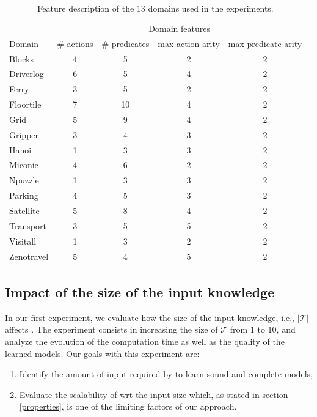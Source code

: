 \begin{table}[hbt!]
		\begin{center}
			\begin{tabular}{l|c|c|c|c|}	
				& \multicolumn{4}{c|}{Domain features}\\ \cline{2-5}
				Domain & \# actions & \# predicates & max action arity & max predicate arity  \\
				\hline
				Blocks & 4 & 5 & 2 & 2  \\
				Driverlog & 6 & 5 & 4 & 2  \\
				Ferry & 3 & 5 & 2 & 2  \\
				Floortile & 7 & 10 & 4 & 2  \\
				Grid & 5 & 9 & 4 & 2  \\
				Gripper & 3 & 4 & 3 & 2  \\
				Hanoi & 1 & 3 & 3 & 2  \\
				Miconic & 4 & 6 & 2 & 2  \\
				Npuzzle & 1 & 3 & 3 & 2  \\
				Parking & 4 & 5 & 3 & 2  \\
				Satellite & 5 & 8 & 4 & 2  \\
				Transport & 3 & 5 & 5 & 2  \\
				Visitall & 1 & 3 & 2 & 2  \\
				Zenotravel & 5 & 4 & 5 & 2
			\end{tabular}
		\end{center}
	\caption{\small Feature description of the 13 domains used in the experiments.}
	\label{tab:domain_features}	
\end{table}

\subsection{Impact of the size of the input knowledge}
In our first experiment, we evaluate how the size of the input knowledge, i.e., $\left|\mathcal{T}\right|$ affects \FAMA. The experiment consists in increasing the size of $\mathcal{T}$ from 1 to 10, and analyze the evolution of the computation time as well as the quality of the learned models. 
Our goals with this experiment are:
\begin{enumerate}
	\item Identify the amount of input required by \FAMA to learn sound and complete models,
	\item Evaluate the scalability of \FAMA wrt the input size which, as stated in section \ref{properties}, is one of the limiting factors of our approach.
\end{enumerate} 

